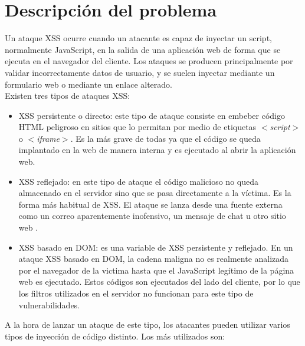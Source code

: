 \section{Descripción del problema}

Un ataque XSS ocurre cuando un atacante es capaz de inyectar un script, normalmente JavaScript, en la salida de una aplicación
web de forma que se ejecuta en el navegador del cliente. Los ataques se producen principalmente por validar incorrectamente datos
de usuario, y se suelen inyectar mediante un formulario web o mediante un enlace alterado.\\

Existen tres tipos de ataques XSS: \\

\begin{itemize}
	\item XSS persistente o directo: este tipo de ataque consiste en embeber código HTML peligroso en sitios que lo permitan por
medio de etiquetas \textit{$<$script$>$ } o \textit{$<$iframe$>$}. Es la más grave de todas ya que el código se queda implantado en la web de
manera interna y es ejecutado al abrir la aplicación web.\\

	\item XSS reflejado: en este tipo de ataque el código malicioso no queda almacenado en el servidor sino que se pasa
directamente a la víctima. Es la forma más habitual de XSS. El ataque se lanza desde una fuente externa como un correo
aparentemente inofensivo, un mensaje de chat u otro sitio web \cite{siete}.\\

	\item XSS basado en DOM: es una variable de XSS persistente y reflejado. En un ataque XSS basado en DOM, la cadena maligna no es realmente analizada por el navegador de la victima hasta que el JavaScript legítimo de la página web es ejecutado. Estos códigos son ejecutados del lado
del cliente, por lo que los filtros utilizados en el servidor no funcionan para este tipo de vulnerabilidades.\\
\end{itemize}

A la hora de lanzar un ataque de este tipo, los atacantes pueden utilizar varios tipos de inyección de código distinto. Los más utilizados son:\\

